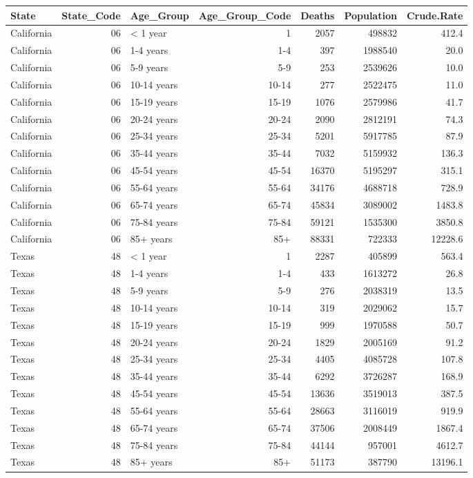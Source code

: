 \documentclass[
  letterpaper,
  DIV=11,
  numbers=noendperiod]{scrreprt}
\begin{document}
\begin{longtable*}{lrlrrrr}
\toprule
State & State\_Code & Age\_Group & Age\_Group\_Code & Deaths & Population & Crude.Rate \\ 
\midrule
California & 06 & < 1 year & 1 & 2057 & 498832 & 412.4 \\ 
California & 06 & 1-4 years & 1-4 & 397 & 1988540 & 20.0 \\ 
California & 06 & 5-9 years & 5-9 & 253 & 2539626 & 10.0 \\ 
California & 06 & 10-14 years & 10-14 & 277 & 2522475 & 11.0 \\ 
California & 06 & 15-19 years & 15-19 & 1076 & 2579986 & 41.7 \\ 
California & 06 & 20-24 years & 20-24 & 2090 & 2812191 & 74.3 \\ 
California & 06 & 25-34 years & 25-34 & 5201 & 5917785 & 87.9 \\ 
California & 06 & 35-44 years & 35-44 & 7032 & 5159932 & 136.3 \\ 
California & 06 & 45-54 years & 45-54 & 16370 & 5195297 & 315.1 \\ 
California & 06 & 55-64 years & 55-64 & 34176 & 4688718 & 728.9 \\ 
California & 06 & 65-74 years & 65-74 & 45834 & 3089002 & 1483.8 \\ 
California & 06 & 75-84 years & 75-84 & 59121 & 1535300 & 3850.8 \\ 
California & 06 & 85+ years & 85+ & 88331 & 722333 & 12228.6 \\ 
Texas & 48 & < 1 year & 1 & 2287 & 405899 & 563.4 \\ 
Texas & 48 & 1-4 years & 1-4 & 433 & 1613272 & 26.8 \\ 
Texas & 48 & 5-9 years & 5-9 & 276 & 2038319 & 13.5 \\ 
Texas & 48 & 10-14 years & 10-14 & 319 & 2029062 & 15.7 \\ 
Texas & 48 & 15-19 years & 15-19 & 999 & 1970588 & 50.7 \\ 
Texas & 48 & 20-24 years & 20-24 & 1829 & 2005169 & 91.2 \\ 
Texas & 48 & 25-34 years & 25-34 & 4405 & 4085728 & 107.8 \\ 
Texas & 48 & 35-44 years & 35-44 & 6292 & 3726287 & 168.9 \\ 
Texas & 48 & 45-54 years & 45-54 & 13636 & 3519013 & 387.5 \\ 
Texas & 48 & 55-64 years & 55-64 & 28663 & 3116019 & 919.9 \\ 
Texas & 48 & 65-74 years & 65-74 & 37506 & 2008449 & 1867.4 \\ 
Texas & 48 & 75-84 years & 75-84 & 44144 & 957001 & 4612.7 \\ 
Texas & 48 & 85+ years & 85+ & 51173 & 387790 & 13196.1 \\ 
\bottomrule
\end{longtable*}
\end{document}

